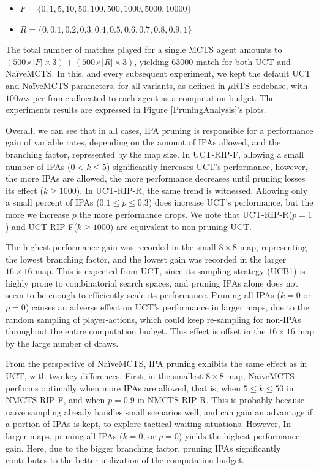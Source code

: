 \documentclass[conference]{IEEEtran}
\newcommand{\mRTS}{$\mu$RTS}
\begin{document}
\begin{itemize}
\item $F = \{0, 1, 5, 10, 50, 100, 500, 1000, 5000, 10000\}$
\item $R = \{0, 0.1, 0.2, 0.3, 0.4, 0.5, 0.6, 0.7, 0.8, 0.9, 1\}$
\end{itemize}

The total number of matches played for a single MCTS agent amounts to $(500\times\vert F\vert\times3) + (500\times\vert R\vert\times3)$, yielding $63000$ match for both UCT and NaïveMCTS. In this, and every subsequent experiment, we kept the default UCT and NaïveMCTS parameters, for all variants, as defined in \mRTS{} codebase, with $100ms$ per frame allocated to each agent as a computation budget. The experiments results are expressed in Figure \ref{PruningAnalysis}'s plots.

Overall, we can see that in all cases, IPA pruning is responsible for a performance gain of variable rates, depending on the amount of IPAs allowed, and the branching factor, represented by the map size. In UCT-RIP-F, allowing a small number of IPAs ($0 < k \leq 5$) significantly increases UCT's performance, however, the more IPAs are allowed, the more performance decreases until pruning losses its effect ($k \geq 1000$). In UCT-RIP-R, the same trend is witnessed. Allowing only a small percent of IPAs ($0.1 \leq p \leq 0.3$) does increase UCT's performance, but the more we increase $p$ the more performance drops. We note that UCT-RIP-R($p=1$) and UCT-RIP-F($k \geq 1000$) are equivalent to non-pruning UCT. 

The highest performance gain was recorded in the small $8\times8$ map, representing the lowest branching factor, and the lowest gain was recorded in the larger $16\times16$ map. This is expected from UCT, since its sampling strategy (UCB1) is highly prone to combinatorial search spaces, and pruning IPAs alone does not seem to be enough to efficiently scale its performance. Pruning all IPAs ($k = 0$ or $p = 0$) causes an adverse effect on UCT's performance in larger maps, due to the random sampling of player-actions, which could keep re-sampling for non-IPAs throughout the entire computation budget. This effect is offset in the $16\times16$ map by the large number of draws.

From the perspective of NaïveMCTS, IPA pruning exhibits the same effect as in UCT, with two key differences. First, in the smallest $8\times8$ map, NaïveMCTS performs optimally when more IPAs are allowed, that is, when $5 \leq k \leq 50$ in NMCTS-RIP-F, and when $p=0.9$ in NMCTS-RIP-R. This is probably because naïve sampling already handles small scenarios well, and can gain an advantage if a portion of IPAs is kept, to explore tactical waiting situations. However, In larger maps, pruning all IPAs ($k = 0$, or $p = 0$) yields the highest performance gain. Here, due to the bigger branching factor, pruning IPAs significantly contributes to the better utilization of the computation budget.
\end{document}
